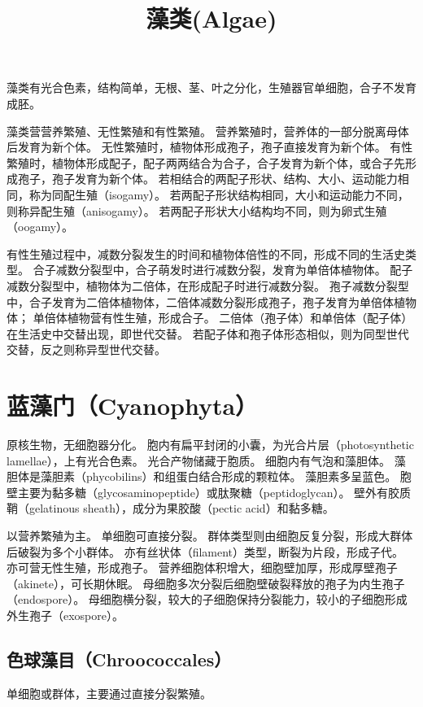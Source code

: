 \documentclass[11pt]{article}
\title{藻类(Algae)}
\date{}
\begin{document}
  \maketitle

  \linenumbers
藻类有光合色素，结构简单，无根、茎、叶之分化，生殖器官单细胞，合子不发育成胚。

\par

藻类营营养繁殖、无性繁殖和有性繁殖。
营养繁殖时，营养体的一部分脱离母体后发育为新个体。
无性繁殖时，植物体形成孢子，孢子直接发育为新个体。
有性繁殖时，植物体形成配子，配子两两结合为合子，合子发育为新个体，或合子先形成孢子，孢子发育为新个体。
若相结合的两配子形状、结构、大小、运动能力相同，称为同配生殖（isogamy）。
若两配子形状结构相同，大小和运动能力不同，则称异配生殖（anisogamy）。
若两配子形状大小结构均不同，则为卵式生殖（oogamy）。

\par

有性生殖过程中，减数分裂发生的时间和植物体倍性的不同，形成不同的生活史类型。
合子减数分裂型中，合子萌发时进行减数分裂，发育为单倍体植物体。
配子减数分裂型中，植物体为二倍体，在形成配子时进行减数分裂。
孢子减数分裂型中，合子发育为二倍体植物体，二倍体减数分裂形成孢子，孢子发育为单倍体植物体；
单倍体植物营有性生殖，形成合子。
二倍体（孢子体）和单倍体（配子体）在生活史中交替出现，即世代交替。
若配子体和孢子体形态相似，则为同型世代交替，反之则称异型世代交替。

\section{蓝藻门（Cyanophyta）}
原核生物，无细胞器分化。
胞内有扁平封闭的小囊，为光合片层（photosynthetic lamellae），上有光合色素。
光合产物储藏于胞质。
细胞内有气泡和藻胆体。
藻胆体是藻胆素（phycobilins）和组蛋白结合形成的颗粒体。
藻胆素多呈蓝色。
胞壁主要为黏多糖（glycosaminopeptide）或肽聚糖（peptidoglycan）。
壁外有胶质鞘（gelatinous sheath），成分为果胶酸（pectic acid）和黏多糖。

\par

以营养繁殖为主。
单细胞可直接分裂。
群体类型则由细胞反复分裂，形成大群体后破裂为多个小群体。
亦有丝状体（filament）类型，断裂为片段，形成子代。
亦可营无性生殖，形成孢子。
营养细胞体积增大，细胞壁加厚，形成厚壁孢子（akinete），可长期休眠。
母细胞多次分裂后细胞壁破裂释放的孢子为内生孢子（endospore）。
母细胞横分裂，较大的子细胞保持分裂能力，较小的子细胞形成外生孢子（exospore）。

\subsection{色球藻目（Chroococcales）}
单细胞或群体，主要通过直接分裂繁殖。
\end{document}
